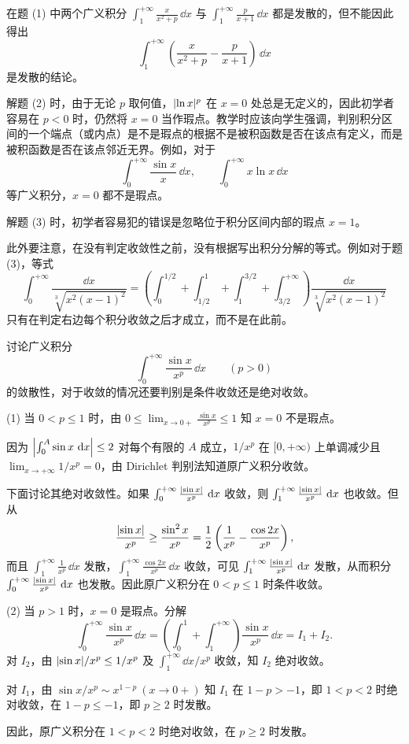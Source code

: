 \begin{xremark}
在题 (1) 中两个广义积分 $\int_1^{+\infty}\frac{x}{x^2+p}\,\dd x$ 与 $\int_1^{+\infty}\frac{p}{x+1}\,\dd x$ 都是发散的，但不能因此得出
\[
  \int_1^{+\infty}\left(\frac{x}{x^2+p}-\frac{p}{x+1}\right)\,\dd x
\]
是发散的结论。

解题 (2) 时，由于无论 $p$ 取何值，$\abs{\ln x}^p$ 在 $x=0$ 处总是无定义的，因此初学者容易在 $p<0$ 时，仍然将 $x=0$ 当作瑕点。教学时应该向学生强调，判别积分区间的一个端点（或内点）是不是瑕点的根据不是被积函数是否在该点有定义，而是被积函数是否在该点邻近无界。例如，对于
\[
  \int_0^{+\infty}\frac{\sin x}{x}\,\dd x,\qquad \int_0^{+\infty}x\ln x\,\dd x
\]
等广义积分，$x=0$ 都不是瑕点。

解题 (3) 时，初学者容易犯的错误是忽略位于积分区间内部的瑕点 $x=1$。

此外要注意，在没有判定收敛性之前，没有根据写出积分分解的等式。例如对于题 (3)，等式
\[
  \int_0^{+\infty}\frac{\dd x}{\sqrt[3]{x^2(x-1)^2}}
  =\left(\int_0^{1/2}+\int_{1/2}^1+\int_1^{3/2}+\int_{3/2}^{+\infty}\right)\frac{\dd x}{\sqrt[3]{x^2(x-1)^2}}
\]
只有在判定右边每个积分收敛之后才成立，而不是在此前。
\end{xremark}

\begin{xexample}[12.2.3]
讨论广义积分
\[
  \int_0^{+\infty}\frac{\sin x}{x^p}\,\dd x\qquad(p>0)
\]
的敛散性，对于收敛的情况还要判别是条件收敛还是绝对收敛。
\end{xexample}
\begin{xsolution}
(1) 当 $0<p\leq1$ 时，由 $0\leq\lim_{x\to0+}\frac{\sin x}{x^p}\leq1$ 知 $x=0$ 不是瑕点。

因为 $\abs*{\int_0^A\sin x\,\dd x}\leq2$ 对每个有限的 $A$ 成立，$1/x^p$ 在 $[0,+\infty)$ 上单调减少且 $\lim_{x\to+\infty}1/x^p=0$，由 Dirichlet 判别法知道原广义积分收敛。

下面讨论其绝对收敛性。如果 $\int_0^{+\infty}\frac{\abs{\sin x}}{x^p}\,\dd x$ 收敛，则 $\int_1^{+\infty}\frac{\abs{\sin x}}{x^p}\,\dd x$ 也收敛。但从
\[
  \frac{\abs{\sin x}}{x^p}\geq\frac{\sin^2x}{x^p}=\frac12\left(\frac1{x^p}-\frac{\cos2x}{x^p}\right),
\]
而且 $\int_1^{+\infty}\frac1{x^p}\,\dd x$ 发散，$\int_1^{+\infty}\frac{\cos2x}{x^p}\,\dd x$ 收敛，可见 $\int_1^{+\infty}\frac{\abs{\sin x}}{x^p}\,\dd x$ 发散，从而积分 $\int_0^{+\infty}\frac{\abs{\sin x}}{x^p}\,\dd x$ 也发散。因此原广义积分在 $0<p\leq1$ 时条件收敛。

(2) 当 $p>1$ 时，$x=0$ 是瑕点。分解
\[
  \int_0^{+\infty}\frac{\sin x}{x^p}\,\dd x
  =\left(\int_0^1+\int_1^{+\infty}\right)\frac{\sin x}{x^p}\,\dd x=I_1+I_2.
\]
对 $I_2$，由 $\abs{\sin x}/x^p\leq1/x^p$ 及 $\int_1^{+\infty}\dd x/x^p$ 收敛，知 $I_2$ 绝对收敛。

对 $I_1$，由 $\sin x/x^p\sim x^{1-p}\ (x\to0+)$ 知 $I_1$ 在 $1-p>-1$，即 $1<p<2$ 时绝对收敛，在 $1-p\leq-1$，即 $p\geq2$ 时发散。

因此，原广义积分在 $1<p<2$ 时绝对收敛，在 $p\geq2$ 时发散。
\end{xsolution}

